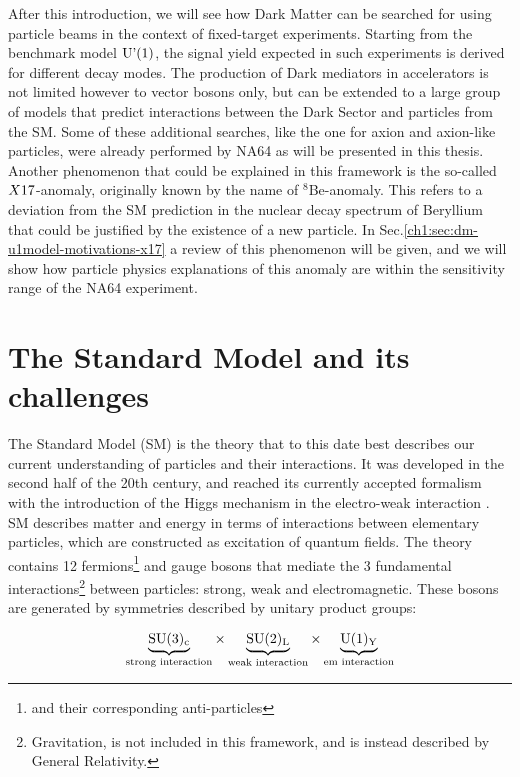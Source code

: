 After this introduction, we will see how Dark Matter can be searched for using particle beams in the context of fixed-target experiments. Starting from the benchmark model $\textrm{U'(1)}$, the signal yield expected in such experiments is derived for different decay modes. The production of Dark mediators in accelerators is not limited however to vector bosons only, but can be extended to a large group of models that predict interactions between the Dark Sector and particles from the SM. Some of these additional searches, like the one for axion and axion-like particles, were already performed by NA64 as will be presented in this thesis.
Another phenomenon that could be explained in this framework is the so-called $X17$-anomaly, originally known by the name of $^8$Be-anomaly. This refers to a deviation from the SM prediction in the nuclear decay spectrum of Beryllium that could be justified by the existence of a new particle. In Sec.\ref{ch1:sec:dm-u1model-motivations-x17} a review of this phenomenon will be given, and we will show how particle physics explanations of this anomaly are within the sensitivity range of the NA64 experiment.


\section{The Standard Model and its challenges}
\label{ch1:sec:sm-puzzles}

The Standard Model (SM) is the theory that to this date best describes our current understanding of particles and their interactions. It was developed in the second half of the 20th century, and reached its currently accepted formalism with the introduction of the Higgs mechanism \cite{PhysRevLett.13.508} in the electro-weak interaction \cite{PhysRevLett.19.1264}. SM describes matter and energy in terms of interactions between elementary particles, which are constructed as excitation of quantum fields. The theory contains 12 fermions\footnote{and their corresponding anti-particles} and gauge bosons that mediate the 3 fundamental interactions\footnote{Gravitation, is not included in this framework, and is instead described by General Relativity.} between particles: strong, weak and electromagnetic. These bosons are generated by symmetries described by unitary product groups:

\begin{equation}
    \label{eq:sm-group}
    \underbrace{\rm{SU(3)_c}}_{\textrm{strong interaction}} \times \underbrace{\rm{SU(2)_L}}_{\textrm{weak interaction}} \times \underbrace{\rm{U(1)_Y}}_{\textrm{em interaction}}
\end{equation}

